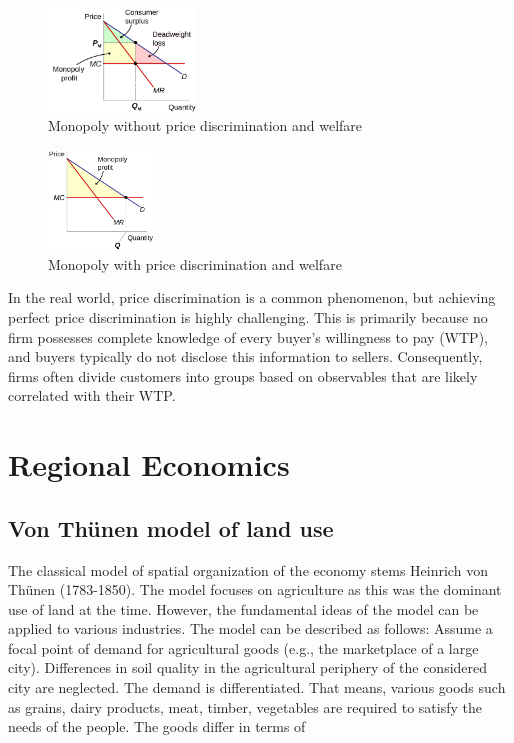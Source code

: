 \documentclass[
  12pt,
  oneside]{book}
\theoremstyle{definition}
\theoremstyle{definition}
\theoremstyle{definition}
\theoremstyle{definition}
\theoremstyle{remark}
\begin{document}
\begin{figure}
\centering
\includegraphics[width=0.35\textwidth,height=\textheight]{fig/discrimination.png}
\caption{\label{fig:monowoutpd} Monopoly without price discrimination and welfare}
\end{figure}

\begin{figure}
\centering
\includegraphics[width=0.25\textwidth,height=\textheight]{fig/discrimination2.png}
\caption{\label{fig:monowpd} Monopoly with price discrimination and welfare}
\end{figure}

In the real world, price discrimination is a common phenomenon, but achieving perfect price discrimination is highly challenging. This is primarily because no firm possesses complete knowledge of every buyer's willingness to pay (WTP), and buyers typically do not disclose this information to sellers. Consequently, firms often divide customers into groups based on observables that are likely correlated with their WTP.

\section{Regional Economics}\label{regional-economics}

\subsection{Von Thünen model of land use}\label{von-thuxfcnen-model-of-land-use}

The classical model of spatial organization of the economy stems Heinrich von Thünen (1783-1850). The model focuses on agriculture as this was the dominant use of land at the time. However, the fundamental ideas of the model can be applied to various industries.
The model can be described as follows: Assume a focal point of demand for agricultural goods (e.g., the marketplace of a large city). Differences in soil quality in the agricultural periphery of the considered city are neglected. The demand is differentiated. That means, various goods such as grains, dairy products, meat, timber, vegetables are required to satisfy the needs of the people. The goods differ in terms of
\end{document}
